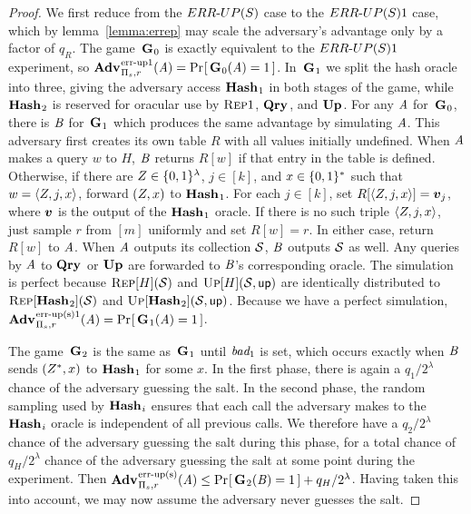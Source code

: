 \begin{proof}

We first reduce from the ${ERR\mbox{-}UP(S)}$ case to the ${ERR\mbox{-}UP(S)}1$ case, which by
lemma~\ref{lemma:errep} may scale the adversary's advantage only by a factor of
$q_R$. The game~$\textup{\textbf{G}}\hspace{0.5pt}_0$ is exactly equivalent to the ${ERR\mbox{-}UP(S)}1$ experiment, so
$\Adv{\errep1}_{\struct_s,r}(\advA) = \Prob{\game_0(\advA) = 1}$. In~$\textup{\textbf{G}}\hspace{0.5pt}_1$
we split the hash oracle into three, giving the adversary access $\textup{\textbf{Hash}}\hspace{0.5pt}_1$ in
both stages of the game, while $\textup{\textbf{Hash}}\hspace{0.5pt}_2$ is reserved for oracular use by
$\textnormal{\textsc{Rep}}1$, $\textup{\textbf{Qry}}\hspace{0.5pt}$, and $\textup{\textbf{Up}}\hspace{0.5pt}$. For any $\mathit{A}$ for~$\textup{\textbf{G}}\hspace{0.5pt}_0$, there is $\mathit{B}$
for~$\textup{\textbf{G}}\hspace{0.5pt}_1$ which produces the same advantage by simulating $\mathit{A}$. This
adversary first creates its own table $R$ with all values initially undefined.
When $\mathit{A}$ makes a query $w$ to $H$, $\mathit{B}$ returns $R[w]$ if that entry in
the table is defined. Otherwise, if there are $Z \in \{0,1\}^\lambda$, $j \in
[k]$, and $x \in \{0,1\}^*$ such that $w = \langle Z, j, x\rangle$, forward
$(Z,x)$ to $\textup{\textbf{Hash}}\hspace{0.5pt}_1$. For each $j \in [k]$, set $R[\langle Z, j,
x\rangle] = \boldsymbol{v}_j$, where $\boldsymbol{v}$ is the output of the $\textup{\textbf{Hash}}\hspace{0.5pt}_1$ oracle. If there
is no such triple $\langle Z, j, x\rangle$, just sample $r$ from $[m]$
uniformly and set $R[w] = r$. In either case, return $R[w]$ to $\mathit{A}$. When
$\mathit{A}$ outputs its collection $\mathcal{S}$, $\mathit{B}$ outputs $\mathcal{S}$ as well. Any
queries by $\mathit{A}$ to $\textup{\textbf{Qry}}\hspace{0.5pt}$ or $\textup{\textbf{Up}}\hspace{0.5pt}$ are forwarded to $\mathit{B}$'s corresponding
oracle. The simulation is perfect because $\textnormal{\textsc{Rep}}[H](\mathcal{S})$ and $\textnormal{\textsc{Up}}[H](\mathcal{S},\mathsf{up})$
are identically distributed to $\textnormal{\textsc{Rep}}[\textup{\textbf{Hash}}\hspace{0.5pt}_2](\mathcal{S})$ and
$\textnormal{\textsc{Up}}[\textup{\textbf{Hash}}\hspace{0.5pt}_2](\mathcal{S},\mathsf{up})$. Because we have a perfect simulation,
$\Adv{\erreps1}_{\struct_s,r}(\advA) = \Prob{\game_1(\advA) = 1}$.

The game~$\textup{\textbf{G}}\hspace{0.5pt}_2$ is the same as~$\textup{\textbf{G}}\hspace{0.5pt}_1$ until $\textit{bad}_1$ is set, which occurs
exactly when $\mathit{B}$ sends $(Z^*,x)$ to $\textup{\textbf{Hash}}\hspace{0.5pt}_1$ for some $x$. In the
first phase, there is again a $q_1/2^\lambda$ chance of the adversary guessing
the salt. In the second phase, the random sampling used by $\textup{\textbf{Hash}}\hspace{0.5pt}_i$ ensures
that each call the adversary makes to the $\textup{\textbf{Hash}}\hspace{0.5pt}_i$ oracle is independent of
all previous calls. We therefore have a $q_2/2^\lambda$ chance of the adversary
guessing the salt during this phase, for a total chance of $q_H/2^\lambda$
chance of the adversary guessing the salt at some point during the experiment.
Then $\Adv{\erreps}_{\struct_s,r}(\advA) \le \Prob{\game_2(\advB) = 1} +
q_H/2^\lambda$. Having taken this into account, we may now assume the adversary
never guesses the salt.


\end{proof}
